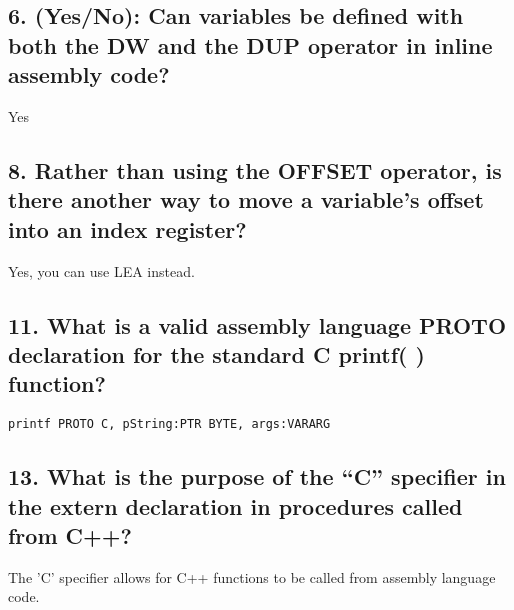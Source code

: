 \documentclass[12pt]{article}
\begin{document}
\subsection*{6. (Yes/No): Can variables be defined with both the DW and the DUP operator in inline assembly code?}
%
Yes
\subsection*{8.  Rather than using the OFFSET operator, is there another way to move a variable’s offset into an index register?}
%
Yes, you can use LEA instead. 
\subsection*{11. What is a valid assembly language PROTO declaration for the standard C printf( ) function?}
%
\texttt{printf PROTO C, pString:PTR BYTE, args:VARARG}
\subsection*{13. What is the purpose of the “C” specifier in the extern declaration in procedures called from C++?}
%
The 'C' specifier allows for C++ functions to be called from assembly language code. 
\end{document}
